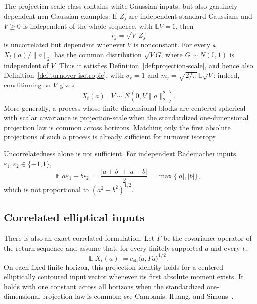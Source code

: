 \documentclass[11pt]{article}
\theoremstyle{definition}
\theoremstyle{remark}
\begin{document}
The projection-scale class contains white Gaussian inputs, but also genuinely
dependent non-Gaussian examples. If $Z_j$ are independent standard Gaussians and
$V\geq0$ is independent of the whole sequence, with $\mathbb E V=1$, then
\[
 r_j=\sqrt V\,Z_j
\]
is uncorrelated but dependent whenever $V$ is nonconstant. For every $a$,
$X_t(a)/\|a\|_2$ has the common distribution $\sqrt V G$, where
$G\sim N(0,1)$ is independent of $V$. Thus it satisfies
Definition~\ref{def:projection-scale}, and hence also
Definition~\ref{def:turnover-isotropic}, with
$\sigma_r=1$ and
$m_r=\sqrt{2/\pi}\,\mathbb E\sqrt V$: indeed, conditioning on $V$ gives
\[
 X_t(a)\mid V\sim N(0,V\|a\|_2^2).
\]
More generally, a process whose finite-dimensional blocks are centered
spherical with scalar covariance is projection-scale when the standardized
one-dimensional projection law is common across horizons. Matching only the
first absolute projections of such a process is already sufficient for
turnover isotropy.

Uncorrelatedness alone is not sufficient. For independent Rademacher inputs
$\varepsilon_1,\varepsilon_2\in\{-1,1\}$,
\[
 \mathbb E|a\varepsilon_1+b\varepsilon_2|
 =\frac{|a+b|+|a-b|}{2}
 =\max\{|a|,|b|\},
\]
which is not proportional to $(a^2+b^2)^{1/2}$.

\subsection{Correlated elliptical inputs}
There is also an exact correlated formulation. Let $\Gamma$ be the covariance
operator of the return sequence and assume that, for every finitely supported
$a$ and every $t$,
\begin{equation}\label{eq:elliptical-projection}
 \mathbb E|X_t(a)|=c_{\mathrm{ell}}
 \langle a,\Gamma a\rangle^{1/2}.
\end{equation}
On each fixed finite horizon, this projection identity holds for a centered
elliptically contoured input vector whenever its first absolute moment exists.
It holds with one constant across all horizons when the standardized
one-dimensional projection law is common; see Cambanis, Huang, and
Simons~\cite{CambanisElliptical}.
\end{document}
